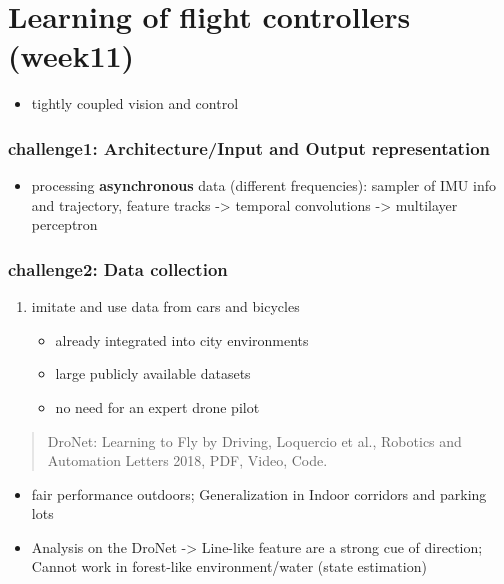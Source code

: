 \documentclass[]{article}
\begin{document}
\section{Learning of flight controllers (week11)}\label{header-n2722}

\begin{itemize}
\item
  tightly coupled vision and control
\end{itemize}

\subsubsection{challenge1: Architecture/Input and Output
representation}\label{header-n2726}

\begin{itemize}
\item
  processing \textbf{asynchronous} data (different frequencies): sampler
  of IMU info and trajectory, feature tracks -\textgreater{} temporal
  convolutions -\textgreater{} multilayer perceptron
\end{itemize}

\subsubsection{challenge2: Data collection}\label{header-n2730}

\begin{enumerate}
\def\labelenumi{\arabic{enumi}.}
\item
  imitate and use data from cars and bicycles

  \begin{itemize}
  \item
    already integrated into city environments
  \item
    large publicly available datasets
  \item
    no need for an expert drone pilot
  \end{itemize}
\end{enumerate}

\begin{quote}
DroNet: Learning to Fly by Driving, Loquercio et al., Robotics and
Automation Letters 2018, PDF, Video, Code.
\end{quote}

\begin{itemize}
\item
  fair performance outdoors; Generalization in Indoor corridors and
  parking lots
\item
  Analysis on the DroNet -\textgreater{} Line-like feature are a strong
  cue of direction; Cannot work in forest-like environment/water (state
  estimation)
\end{itemize}
\end{document}
